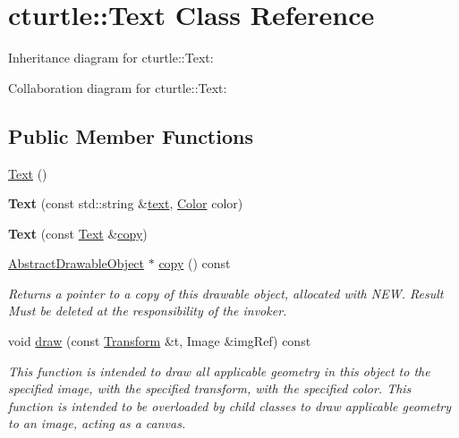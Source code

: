 \hypertarget{classcturtle_1_1Text}{}\section{cturtle\+:\+:Text Class Reference}
\label{classcturtle_1_1Text}


Inheritance diagram for cturtle\+:\+:Text\+:


Collaboration diagram for cturtle\+:\+:Text\+:
\subsection*{Public Member Functions}
\begin{DoxyCompactItemize}
\item 
\hyperlink{classcturtle_1_1Text_aad06f49d01be75cbfafedb64a38cfc29}{Text} ()
\item 
\mbox{\label{classcturtle_1_1Text_a9adab9abc546c76b39feb594e0f4de1a}} 
{\bfseries Text} (const std\+::string \&\hyperlink{classcturtle_1_1Text_ac631d8199ccd9ae56f661e22acc157d9}{text}, \hyperlink{classcturtle_1_1Color}{Color} color)
\item 
\mbox{\label{classcturtle_1_1Text_acea0ae681ef02899079547d852810687}} 
{\bfseries Text} (const \hyperlink{classcturtle_1_1Text}{Text} \&\hyperlink{classcturtle_1_1Text_acb0908ae70d1194d6e47a8f8ba51461a}{copy})
\item 
\mbox{\label{classcturtle_1_1Text_acb0908ae70d1194d6e47a8f8ba51461a}} 
\hyperlink{classcturtle_1_1AbstractDrawableObject}{Abstract\+Drawable\+Object} $\ast$ \hyperlink{classcturtle_1_1Text_acb0908ae70d1194d6e47a8f8ba51461a}{copy} () const
\begin{DoxyCompactList}\small\item\em Returns a pointer to a copy of this drawable object, allocated with N\+EW. Result Must be deleted at the responsibility of the invoker. \end{DoxyCompactList}\item 
void \hyperlink{classcturtle_1_1Text_a80003e4c447def1c7de8daf29a8fc5ec}{draw} (const \hyperlink{classcturtle_1_1Transform}{Transform} \&t, Image \&img\+Ref) const
\begin{DoxyCompactList}\small\item\em This function is intended to draw all applicable geometry in this object to the specified image, with the specified transform, with the specified color. This function is intended to be overloaded by child classes to draw applicable geometry to an image, acting as a canvas. \end{DoxyCompactList}\end{DoxyCompactItemize}
